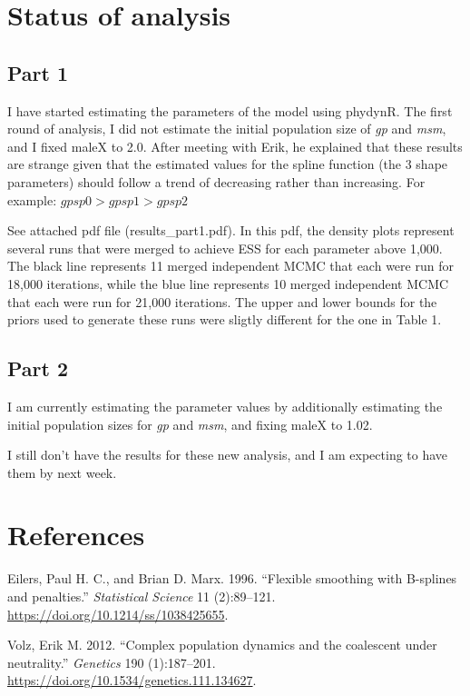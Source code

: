 \documentclass[12pt,]{article}
\begin{document}
\hypertarget{status-of-analysis}{%
\section{Status of analysis}\label{status-of-analysis}}

\hypertarget{part-1}{%
\subsection{Part 1}\label{part-1}}

I have started estimating the parameters of the model using phydynR. The
first round of analysis, I did not estimate the initial population size
of \emph{gp} and \emph{msm}, and I fixed maleX to 2.0. After meeting
with Erik, he explained that these results are strange given that the
estimated values for the spline function (the 3 shape parameters) should
follow a trend of decreasing rather than increasing. For example:
\(gpsp0 > gpsp1 > gpsp2\)

See attached pdf file (results\_part1.pdf). In this pdf, the density
plots represent several runs that were merged to achieve ESS for each
parameter above 1,000. The black line represents 11 merged independent
MCMC that each were run for 18,000 iterations, while the blue line
represents 10 merged independent MCMC that each were run for 21,000
iterations. The upper and lower bounds for the priors used to generate
these runs were sligtly different for the one in Table 1.

\hypertarget{part-2}{%
\subsection{Part 2}\label{part-2}}

I am currently estimating the parameter values by additionally
estimating the initial population sizes for \emph{gp} and \emph{msm},
and fixing maleX to 1.02.

I still don't have the results for these new analysis, and I am
expecting to have them by next week.

\hypertarget{references}{%
\section*{References}\label{references}}

\hypertarget{refs}{}
\leavevmode\hypertarget{ref-Eilers1996}{}%
Eilers, Paul H. C., and Brian D. Marx. 1996. ``Flexible smoothing with
B-splines and penalties.'' \emph{Statistical Science} 11 (2):89--121.
\url{https://doi.org/10.1214/ss/1038425655}.

\leavevmode\hypertarget{ref-Volz2012}{}%
Volz, Erik M. 2012. ``Complex population dynamics and the coalescent
under neutrality.'' \emph{Genetics} 190 (1):187--201.
\url{https://doi.org/10.1534/genetics.111.134627}.
\end{document}
